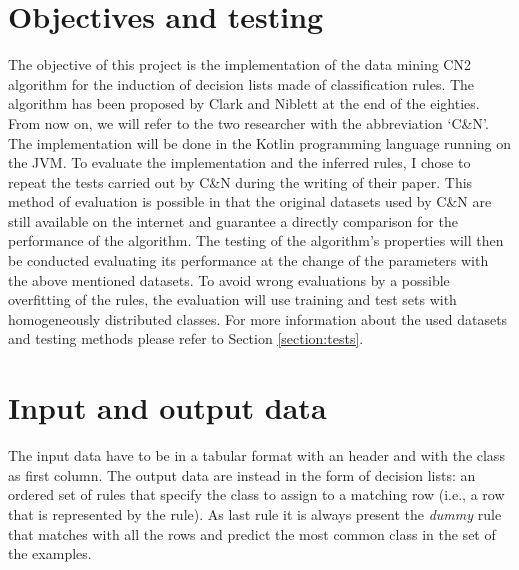 \documentclass{article}
\begin{document}
\section{Objectives and testing}
The objective of this project is the implementation of the data mining CN2 algorithm for the induction of decision lists made of classification rules. The algorithm has been proposed by Clark and Niblett at the end of the eighties. From now on, we will refer to the two researcher with the abbreviation `C\&N'.
\vspace{12pt}\newline
The implementation will be done in the Kotlin programming language running on the JVM.
\vspace{12pt}\newline
To evaluate the implementation and the inferred rules, I chose to repeat the tests carried out by C\&N during the writing of their paper.\newline
This method of evaluation is possible in that the original datasets used by C\&N are still available on the internet and guarantee a directly comparison for the performance of the algorithm.\newline
The testing of the algorithm's properties will then be conducted evaluating its performance at the change of the parameters with the above mentioned datasets.\newline
To avoid wrong evaluations by a possible overfitting of the rules, the evaluation will use training and test sets with homogeneously distributed classes.
\vspace{12pt}\newline
For more information about the used datasets and testing methods please refer to Section \ref{section:tests}.
\newpage


\section{Input and output data}\label{section:io}
The input data have to be in a tabular format with an header and with the class as first column. The output data are instead in the form of decision lists: an ordered set of rules that specify the class to assign to a matching row (i.e., a row that is represented by the rule). As last rule it is always present the \textit{dummy} rule that matches with all the rows and predict the most common class in the set of the examples.
\end{document}
